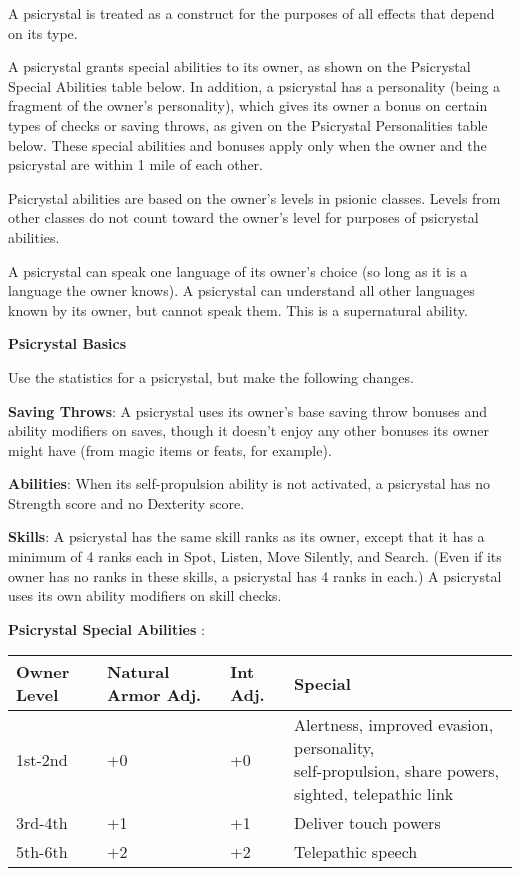 A psicrystal is treated as a construct for the purposes of all effects that depend on its type.

A psicrystal grants special abilities to its owner, as shown on the Psicrystal Special Abilities table below. In addition, a psicrystal has a personality (being a fragment of the owner's personality), which gives its owner a bonus on certain types of checks or saving throws, as given on the Psicrystal Personalities table below. These special abilities and bonuses apply only when the owner and the psicrystal are within 1 mile of each other.

Psicrystal abilities are based on the owner's levels in psionic classes. Levels from other classes do not count toward the owner's level for purposes of psicrystal abilities.

A psicrystal can speak one language of its owner's choice (so long as it is a language the owner knows). A psicrystal can understand all other languages known by its owner, but cannot speak them. This is a supernatural ability.

\textbf{\large{Psicrystal Basics}}

Use the statistics for a psicrystal, but make the following changes.

\textbf{Saving Throws}: A psicrystal uses its owner's base saving throw bonuses and ability modifiers on saves, though it doesn't enjoy any other bonuses its owner might have (from magic items or feats, for example).

\textbf{Abilities}: When its self-propulsion ability is not activated, a psicrystal has no Strength score and no Dexterity score.

\textbf{Skills}: A psicrystal has the same skill ranks as its owner, except that it has a minimum of 4 ranks each in Spot, Listen, Move Silently, and Search. (Even if its owner has no ranks in these skills, a psicrystal has 4 ranks in each.) A psicrystal uses its own ability modifiers on skill checks.

\textbf{Psicrystal Special Abilities
}:
\begin{center}
\begin{adjustwidth}{-4cm}{}
\begin{small}
\begin{tabular}{| l | l | l | l |}
\hline
Owner Level &Natural Armor Adj. &Int Adj. &Special \\
\hline
1st-2nd &+0 &+0 &\makecell{Alertness, improved evasion, personality,\\ self-propulsion, share powers, sighted, telepathic link} \\
3rd-4th &+1 &+1 &Deliver touch powers \\
5th-6th &+2 &+2 &Telepathic speech \\
\hline
\end{tabular}
\end{small}
\end{adjustwidth}
\end{center}

